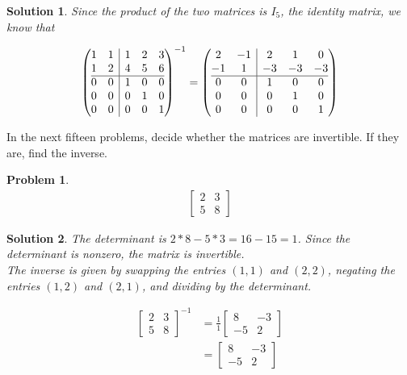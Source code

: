 \documentclass{article}
\newtheorem{problem}{Problem}
\newtheorem*{solution}{Solution}
\begin{document}
\begin{solution}
Since the product of the two matrices is $I_{5}$, the identity matrix, we know that

\begin{align*}
\left(
\begin{array}{@{}cc|ccc@{}}
1 & 1 & 1 & 2 & 3 \\
1 & 2 & 4 & 5 & 6 \\ \hline
0 & 0 & 1 & 0 & 0 \\
0 & 0 & 0 & 1 & 0 \\
0 & 0 & 0 & 0 & 1
\end{array}
\right)^{-1} =
\left(
\begin{array}{@{}cc|ccc@{}}
2 & -1 & 2 & 1 & 0 \\
-1 & 1 & -3 & -3 & -3 \\ \hline
0 & 0 & 1 & 0 & 0 \\
0 & 0 & 0 & 1 & 0 \\
0 & 0 & 0 & 0 & 1
\end{array}
\right) 
\end{align*}
\end{solution}

In the next fifteen problems, decide whether the matrices are invertible. If they are, find the inverse.

\begin{problem}
\begin{align*}
\begin{bmatrix}
2 & 3 \\ 5 & 8
\end{bmatrix}
\end{align*}
\end{problem}

\begin{solution}
The determinant is $2 * 8 - 5 * 3 = 16 - 15 = 1$. Since the determinant is nonzero, the matrix is invertible. \\

The inverse is given by swapping the entries $(1, 1)$ and $(2, 2)$, negating the entries $(1, 2)$ and $(2, 1)$, and dividing by the determinant.

\begin{align*}
\begin{bmatrix}
2 & 3 \\ 5 & 8
\end{bmatrix}^{-1} 
&= \displaystyle \frac{1}{1} \begin{bmatrix}
8 & -3 \\ -5 & 2
\end{bmatrix} \\
&= \begin{bmatrix}
8 & -3 \\ -5 & 2
\end{bmatrix}
\end{align*}
\end{solution}
\end{document}

